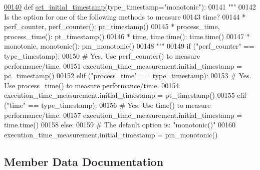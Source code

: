 \begin{DoxyCode}
\hypertarget{classutilities_1_1timing__measurements_1_1performance__measurement__no__ns_1_1execution__time__measurement_l00140}{}\hyperlink{classutilities_1_1timing__measurements_1_1performance__measurement__no__ns_1_1execution__time__measurement_ac1a396608592993d871613a73d20b088}{00140}     \textcolor{keyword}{def }\hyperlink{classutilities_1_1timing__measurements_1_1performance__measurement__no__ns_1_1execution__time__measurement_ac1a396608592993d871613a73d20b088}{set\_initial\_timestamp}(type\_timestamp="monotonic"):
00141         \textcolor{stringliteral}{"""}
00142 \textcolor{stringliteral}{            Is the option for one of the following methods to measure}
00143 \textcolor{stringliteral}{                time?}
00144 \textcolor{stringliteral}{                * perf\_counter, perf\_counter(): pc\_timestamp()}
00145 \textcolor{stringliteral}{                * process\_time, process\_time(): pt\_timestamp()}
00146 \textcolor{stringliteral}{                * time, time.time(): time.time()}
00147 \textcolor{stringliteral}{                * monotonic, monotonic(): pm\_monotonic()}
00148 \textcolor{stringliteral}{        """}
00149         \textcolor{keywordflow}{if} (\textcolor{stringliteral}{"perf\_counter"} == type\_timestamp):
00150             \textcolor{comment}{# Yes. Use perf\_counter() to measure performance/time.}
00151             execution\_time\_measurement.initial\_timestamp = pc\_timestamp()
00152         \textcolor{keywordflow}{elif} (\textcolor{stringliteral}{"process\_time"} == type\_timestamp):
00153             \textcolor{comment}{# Yes. Use process\_time() to measure performance/time.}
00154             execution\_time\_measurement.initial\_timestamp = pt\_timestamp()
00155         \textcolor{keywordflow}{elif} (\textcolor{stringliteral}{"time"} == type\_timestamp):
00156             \textcolor{comment}{# Yes. Use time() to measure performance/time.}
00157             execution\_time\_measurement.initial\_timestamp = time.time()
00158         \textcolor{keywordflow}{else}:
00159             \textcolor{comment}{# The default option is: "monotonic()"}
00160             execution\_time\_measurement.initial\_timestamp = pm\_monotonic()
\end{DoxyCode}


\subsection{Member Data Documentation}
\hypertarget{classutilities_1_1timing__measurements_1_1performance__measurement__no__ns_1_1execution__time__measurement_a75ac358ee6e04eba517fd6dd429c99a1}{}
